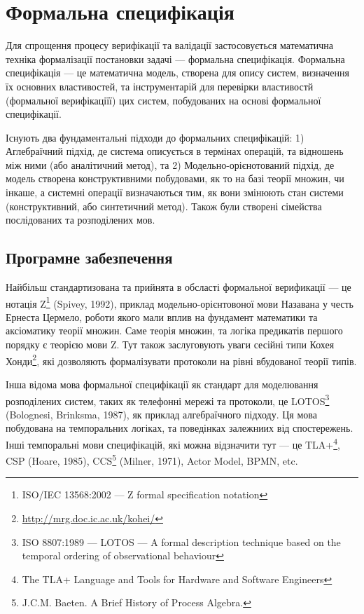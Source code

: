 \section{Формальна специфікація}
Для спрощення процесу верифікації та валідації
застосовується математична техніка формалізації постановки задачі --- формальна специфікація.
Формальна специфікація --- це математична модель, створена для опису систем,
визначення їх основних властивостей, та інструментарій для перевірки
властивостй (формальної верифікаціїї) цих систем, побудованих на основі формальної специфікації.

Існують два фундаментальні підходи до формальних специфікацій: 1) Аглебраїчний підхід, де
система описується в термінах операцій, та відношень між ними (або аналітичний метод), та
2) Модельно-орієнотований підхід, де модель створена конструктивними побудовами,
як то на базі теорії множин, чи інкаше, а системні операції визначаються тим,
як вони змінюють стан системи (конструктивний, або синтетичний метод).
Також були створені сімейства послідованих та розподілених мов.

\subsection{Програмне забезпечення}
Найбільш стандартизована та прийнята в обсласті формальної верификації --- це нотація
Z\footnote{ISO/IEC 13568:2002 --- Z formal specification notation} (Spivey, 1992), приклад
модельно-орієнтовоної мови
Назавана у честь Ернеста Цермело, роботи якого мали вплив на фундамент математики та аксіоматику
теорії множин. Саме теорія множин, та логіка предикатів першого порядку є теорією мови Z.
Тут також заслуговують уваги сесійні типи Кохея Хонди\footnote{\url{ http://mrg.doc.ic.ac.uk/kohei/}},
які дозволяють формалізувати протоколи на рівні вбудованої теорії типів.

Інша відома мова формальної специфікації як стандарт
для моделювання розподілених систем, таких як телефонні мережі та протоколи, це
LOTOS\footnote{ISO 8807:1989 --- LOTOS --- A formal description technique based
on the temporal ordering of observational behaviour} (Bolognesi, Brinksma, 1987),
як приклад алгебраїчного підходу.
Ця мова побудована на темпоральних логіках, та поведінках залежниих від спостережень.
Інші темпоральні мови специфікацій, які можна відзначити тут --- це TLA+\footnote{The
TLA+ Language and Tools for Hardware and Software Engineers}, CSP (Hoare, 1985),
CCS\footnote{J.C.M. Baeten. A Brief History of Process Algebra.} (Milner, 1971), Actor Model, BPMN, etc.

